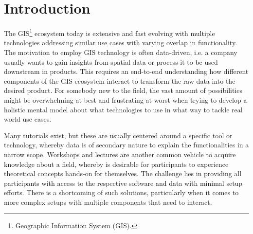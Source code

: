 \documentclass[11pt, a4paper, oneside, parskip=full-]{scrartcl}
\begin{document}
\newpage
{}
\setcounter{page}{1}
\section{Introduction}

The GIS\footnote{Geographic Information System (GIS).} ecosystem today is
extensive and fast evolving with multiple technologies addressing similar use
cases with varying overlap in functionality. The motivation to employ GIS
technology is often data-driven, i.e. a company usually wants to gain insights
from spatial data or process it to be used downstream in products. This requires
an end-to-end understanding how different components of the GIS ecosystem
interact to transform the raw data into the desired product. For somebody new to
the field, the vast amount of possibilities might be overwhelming at best and
frustrating at worst when trying to develop a holistic mental model about what
technologies to use in what way to tackle real world use cases.

Many tutorials exist, but these are usually centered around a specific tool or
technology, whereby data is of secondary nature to explain the functionalities
in a narrow scope. Workshops and lectures are another common vehicle to acquire
knowledge about a field, whereby is desirable for participants to experience
theoretical concepts hands-on for themselves. The challenge lies in providing
all participants with access to the respective software and data with minimal
setup efforts. There is a shortcoming of such solutions, particularly when it
comes to more complex setups with multiple components that need to interact.
\end{document}
